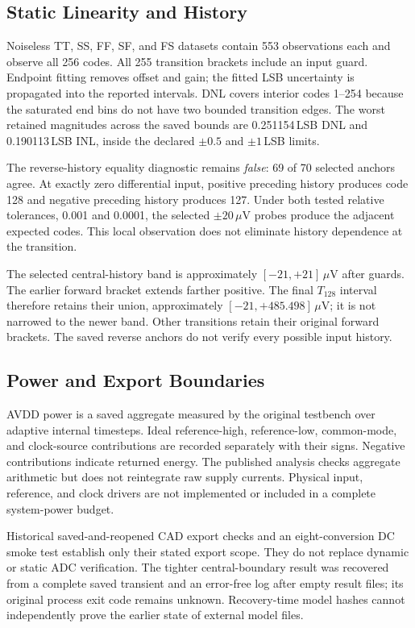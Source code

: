 \documentclass[10pt,conference,letterpaper]{IEEEtran}
\begin{document}
\subsection{Static Linearity and History}
Noiseless TT, SS, FF, SF, and FS datasets contain 553 observations each and observe all 256 codes. All 255 transition brackets include an input guard. Endpoint fitting removes offset and gain; the fitted LSB uncertainty is propagated into the reported intervals. DNL covers interior codes 1--254 because the saturated end bins do not have two bounded transition edges. The worst retained magnitudes across the saved bounds are 0.251154\,LSB DNL and 0.190113\,LSB INL, inside the declared $\pm0.5$ and $\pm1$\,LSB limits.

The reverse-history equality diagnostic remains \emph{false}: 69 of 70 selected anchors agree. At exactly zero differential input, positive preceding history produces code 128 and negative preceding history produces 127. Under both tested relative tolerances, 0.001 and 0.0001, the selected $\pm20$\,$\mu$V probes produce the adjacent expected codes. This local observation does not eliminate history dependence at the transition.

The selected central-history band is approximately $[-21,+21]$\,$\mu$V after guards. The earlier forward bracket extends farther positive. The final $T_{128}$ interval therefore retains their union, approximately $[-21,+485.498]$\,$\mu$V; it is not narrowed to the newer band. Other transitions retain their original forward brackets. The saved reverse anchors do not verify every possible input history.

\subsection{Power and Export Boundaries}
AVDD power is a saved aggregate measured by the original testbench over adaptive internal timesteps. Ideal reference-high, reference-low, common-mode, and clock-source contributions are recorded separately with their signs. Negative contributions indicate returned energy. The published analysis checks aggregate arithmetic but does not reintegrate raw supply currents. Physical input, reference, and clock drivers are not implemented or included in a complete system-power budget.

Historical saved-and-reopened CAD export checks and an eight-conversion DC smoke test establish only their stated export scope. They do not replace dynamic or static ADC verification. The tighter central-boundary result was recovered from a complete saved transient and an error-free log after empty result files; its original process exit code remains unknown. Recovery-time model hashes cannot independently prove the earlier state of external model files.
\end{document}

